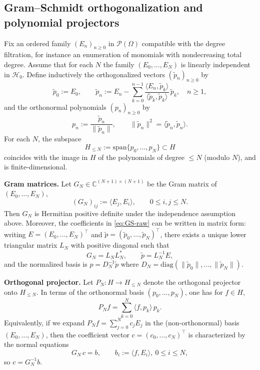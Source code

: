 \documentclass{amsart}
\numberwithin{equation}{section}
\theoremstyle{definition}
\theoremstyle{remark}
\begin{document}
\subsection{Gram--Schmidt orthogonalization and polynomial projectors}

Fix an ordered family $(E_n)_{n\ge 0}$ in $\mathcal P(\Omega)$ compatible with the degree filtration,
for instance an enumeration of monomials with nondecreasing total degree.
Assume that for each $N$ the family $(E_0,\dots,E_N)$ is linearly independent in $\mathcal H_0$.
Define inductively the orthogonalized vectors $(\widetilde p_n)_{n\ge 0}$ by
\begin{equation}\label{eq:GS-raw}
\widetilde p_0:=E_0,\qquad
\widetilde p_n:=E_n-\sum_{k=0}^{n-1}\frac{\langle E_n,\widetilde p_k\rangle}{\langle \widetilde p_k,\widetilde p_k\rangle}\,\widetilde p_k,
\quad n\ge 1,
\end{equation}
and the orthonormal polynomials $(p_n)_{n\ge 0}$ by
\begin{equation}\label{eq:GS-orthonormal}
p_n:=\frac{\widetilde p_n}{\|\widetilde p_n\|},\qquad \|\widetilde p_n\|^2=\langle \widetilde p_n,\widetilde p_n\rangle.
\end{equation}
For each $N$, the subspace
\[
H_{\le N}:=\mathrm{span}\{p_0,\dots,p_N\}\subset H
\]
coincides with the image in $H$ of the polynomials of degree $\le N$ (modulo $N$), and is finite-dimensional.

\medskip
\noindent\textbf{Gram matrices.}
Let $G_N\in\mathbb C^{(N+1)\times(N+1)}$ be the Gram matrix of $(E_0,\dots,E_N)$,
\begin{equation}\label{eq:Gram-matrix}
(G_N)_{ij}:=\langle E_j,E_i\rangle,\qquad 0\le i,j\le N.
\end{equation}
Then $G_N$ is Hermitian positive definite under the independence assumption above.
Moreover, the coefficients in \eqref{eq:GS-raw} can be written in matrix form:
writing $E=(E_0,\dots,E_N)^\top$ and $\widetilde p=(\widetilde p_0,\dots,\widetilde p_N)^\top$,
there exists a unique lower triangular matrix $L_N$ with positive diagonal such that
\begin{equation}\label{eq:Cholesky-GS}
G_N=L_NL_N^*,\qquad \widetilde p=L_N^{-1}E,
\end{equation}
and the normalized basis is $p=D_N^{-1}\widetilde p$ where $D_N=\mathrm{diag}(\|\widetilde p_0\|,\dots,\|\widetilde p_N\|)$.

\medskip
\noindent\textbf{Orthogonal projector.}
Let $P_N:H\to H_{\le N}$ denote the orthogonal projector onto $H_{\le N}$.
In terms of the orthonormal basis $(p_0,\dots,p_N)$, one has for $f\in H$,
\begin{equation}\label{eq:projector-formula}
P_N f=\sum_{k=0}^N \langle f,p_k\rangle\,p_k.
\end{equation}
Equivalently, if we expand $P_N f=\sum_{j=0}^N c_j E_j$ in the (non-orthonormal) basis $(E_0,\dots,E_N)$,
then the coefficient vector $c=(c_0,\dots,c_N)^\top$ is characterized by the normal equations
\begin{equation}\label{eq:normal-equations}
G_N\,c=b,\qquad b_i:=\langle f,E_i\rangle,\ 0\le i\le N,
\end{equation}
so $c=G_N^{-1}b$.
\end{document}
